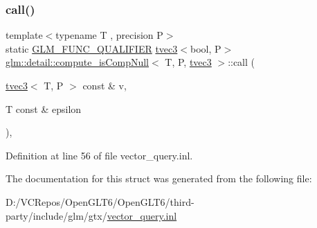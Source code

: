 \subsubsection{\texorpdfstring{call()}{call()}}
{\footnotesize\ttfamily template$<$typename T , precision P$>$ \\
static \mbox{\hyperlink{setup_8hpp_a33fdea6f91c5f834105f7415e2a64407}{G\+L\+M\+\_\+\+F\+U\+N\+C\+\_\+\+Q\+U\+A\+L\+I\+F\+I\+ER}} \mbox{\hyperlink{structglm_1_1tvec3}{tvec3}}$<$bool, P$>$ \mbox{\hyperlink{structglm_1_1detail_1_1compute__is_comp_null}{glm\+::detail\+::compute\+\_\+is\+Comp\+Null}}$<$ T, P, \mbox{\hyperlink{structglm_1_1tvec3}{tvec3}} $>$\+::call (\begin{DoxyParamCaption}\item[{\mbox{\hyperlink{structglm_1_1tvec3}{tvec3}}$<$ T, P $>$ const \&}]{v,  }\item[{T const \&}]{epsilon }\end{DoxyParamCaption})\hspace{0.3cm}{\ttfamily [inline]}, {\ttfamily [static]}}



Definition at line 56 of file vector\+\_\+query.\+inl.



The documentation for this struct was generated from the following file\+:\begin{DoxyCompactItemize}
\item 
D\+:/\+V\+C\+Repos/\+Open\+G\+L\+T6/\+Open\+G\+L\+T6/third-\/party/include/glm/gtx/\mbox{\hyperlink{vector__query_8inl}{vector\+\_\+query.\+inl}}\end{DoxyCompactItemize}
